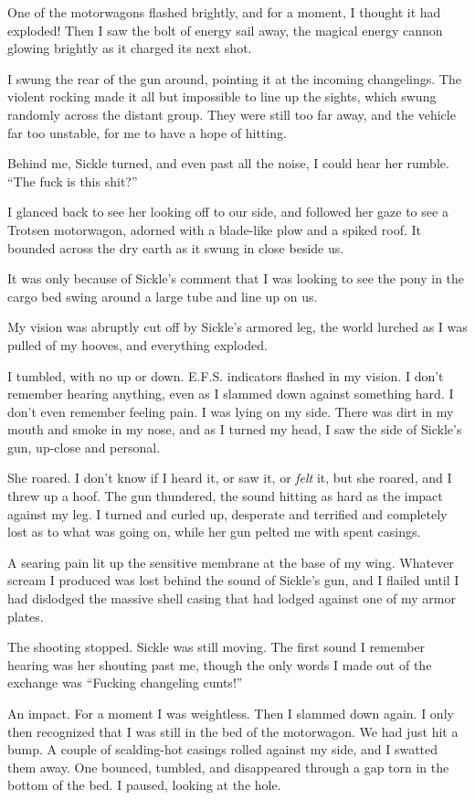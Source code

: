One of the motorwagons flashed brightly, and for a moment, I thought it had exploded! Then I saw the bolt of energy sail away, the magical energy cannon glowing brightly as it charged its next shot.

I swung the rear of the gun around, pointing it at the incoming changelings. The violent rocking made it all but impossible to line up the sights, which swung randomly across the distant group. They were still too far away, and the vehicle far too unstable, for me to have a hope of hitting.

Behind me, Sickle turned, and even past all the noise, I could hear her rumble. “The fuck is this shit?”

I glanced back to see her looking off to our side, and followed her gaze to see a Trotsen motorwagon, adorned with a blade-like plow and a spiked roof. It bounded across the dry earth as it swung in close beside us.

It was only because of Sickle’s comment that I was looking to see the pony in the cargo bed swing around a large tube and line up on us.

My vision was abruptly cut off by Sickle’s armored leg, the world lurched as I was pulled of my hooves, and everything exploded.

I tumbled, with no up or down. E.F.S. indicators flashed in my vision. I don’t remember hearing anything, even as I slammed down against something hard. I don’t even remember feeling pain. I was lying on my side. There was dirt in my mouth and smoke in my nose, and as I turned my head, I saw the side of Sickle’s gun, up-close and personal.

She roared. I don’t know if I heard it, or saw it, or \textit{felt} it, but she roared, and I threw up a hoof. The gun thundered, the sound hitting as hard as the impact against my leg. I turned and curled up, desperate and terrified and completely lost as to what was going on, while her gun pelted me with spent casings.

A searing pain lit up the sensitive membrane at the base of my wing. Whatever scream I produced was lost behind the sound of Sickle’s gun, and I flailed until I had dislodged the massive shell casing that had lodged against one of my armor plates.

The shooting stopped. Sickle was still moving. The first sound I remember hearing was her shouting past me, though the only words I made out of the exchange was “Fucking changeling cunts!”

An impact. For a moment I was weightless. Then I slammed down again. I only then recognized that I was still in the bed of the motorwagon. We had just hit a bump. A couple of scalding-hot casings rolled against my side, and I swatted them away. One bounced, tumbled, and disappeared through a gap torn in the bottom of the bed. I paused, looking at the hole.

